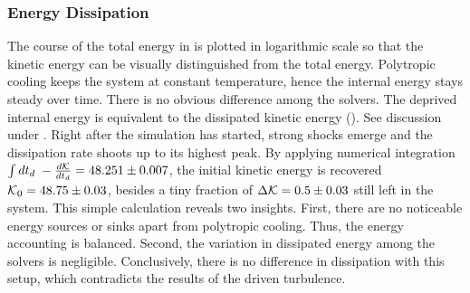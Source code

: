 
\subsubsection{Energy Dissipation}
\label{sec:decayturb-ekin-diss}
The course of the total energy in  is plotted in
logarithmic scale so that the kinetic energy can be visually distinguished from
the total energy. Polytropic cooling keeps the system at constant temperature,
hence the internal energy stays steady over time. There is no obvious
difference among the solvers.  The deprived internal energy is equivalent to
the dissipated kinetic energy (). See
discussion under . Right after the simulation has
started, strong shocks emerge and the dissipation rate shoots up to its highest
peak. By applying numerical integration
$\int dt_d \; -\frac{d\mathcal{K}}{dt_d} = 48.251 \pm 0.007$,  the initial kinetic
energy is recovered $\mathcal{K}_0 = 48.75 \pm 0.03$, besides a tiny fraction of
$\Delta \mathcal{K} = 0.5 \pm 0.03$ still left in the system. This simple calculation
reveals two insights. First, there are no noticeable energy sources or sinks
apart from  polytropic cooling. Thus, the energy accounting is balanced. Second,
the variation in dissipated energy among the solvers is negligible. Conclusively,
there is no difference in dissipation with this setup, which contradicts the
results of the driven turbulence.


